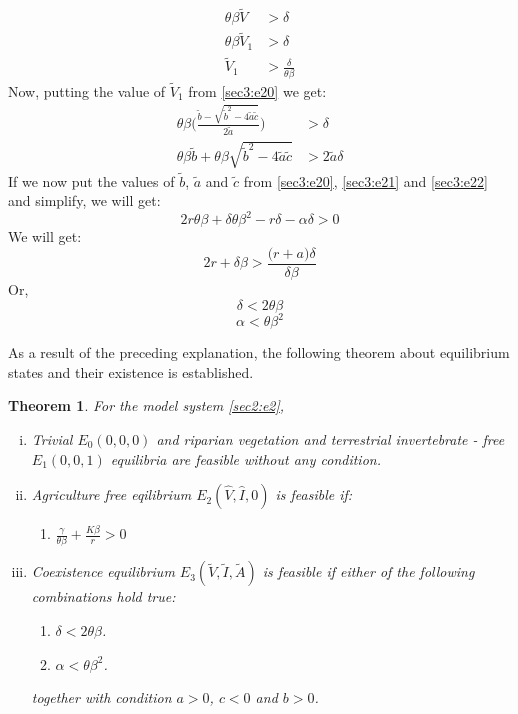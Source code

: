\documentclass[12pt]{article}
\newtheorem{theorem}{Theorem}[section]
\numberwithin{equation}{section}
\begin{document}
\begin{enumerate}[i)]
\begin{align}\label{sec3:e22}
\theta \beta \tilde V &> \delta \\
\theta \beta \tilde V_1 &> \delta \\
\tilde V_1 &> \frac{\delta}{\theta \beta}
\end{align}
Now, putting the value of $\tilde V_1$ from \eqref{sec3:e20} we get:
\begin{align}\label{sec3:e23}
\theta \beta \bigg(  \frac{\tilde b - \sqrt{\tilde b^2 - 4\tilde a \tilde c}}{2 \tilde a} \bigg) &> \delta \\
\theta \beta \tilde b + \theta \beta \sqrt{\tilde b^2-4\tilde a \tilde c} &> 2\tilde a \delta 
\end{align}
If we now put the values of $\tilde b$, $\tilde a$ and $\tilde c$ from \eqref{sec3:e20}, \eqref{sec3:e21} and \eqref{sec3:e22} and simplify, we will get:
\begin{equation}\label{sec3:e24}
2r \theta \beta + \delta \theta \beta^2 - r\delta -\alpha \delta>0
\end{equation}
We will get:
\begin{equation}\label{sec3:e25}
2r + \delta \beta >\frac{\bigg(r+a\bigg)\delta}{\delta \beta}
\end{equation}
Or,
\begin{equation}\label{sec3:e26}
\delta < 2 \theta \beta
\end{equation}
\begin{equation}\label{sec3:e27}
\alpha < \theta \beta^2
\end{equation}
\end{enumerate}
As a result of the preceding explanation, the following theorem about equilibrium states and their existence is established.
\begin{theorem}\label{Theorem 3.3}
For the model system \eqref{sec2:e2},
\begin{enumerate}[i.)]
\item Trivial $E_0(0,0,0)$ and riparian vegetation and terrestrial invertebrate - free $E_1(0,0,1)$ equilibria are feasible without any condition.
\item Agriculture free eqilibrium $E_2(\hat V, \hat I, 0)$ is feasible if:
\begin{enumerate}
\item $\frac{\gamma}{\theta \beta} + \frac{K \beta}{r} >0$
\end{enumerate}
\item Coexistence equilibrium  $E_3(\tilde V, \tilde I, \tilde A)$ is feasible if either of the following combinations hold true:
\begin{enumerate}
     \item $\delta < 2 \theta \beta$.
     \item $\alpha < \theta \beta^2$.
\end{enumerate}
     together with condition $a>0$, $c<0$ and $b>0$.
\end{enumerate}
\end{theorem}
\vspace{-1cm}
\end{document}
